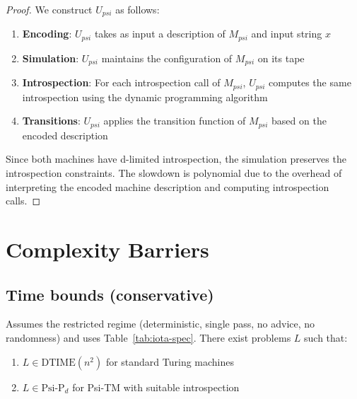 \begin{proof}
We construct $U_{psi}$ as follows:

\begin{enumerate}
\item \textbf{Encoding}: $U_{psi}$ takes as input a description of $M_{psi}$ and input string $x$
\item \textbf{Simulation}: $U_{psi}$ maintains the configuration of $M_{psi}$ on its tape
\item \textbf{Introspection}: For each introspection call of $M_{psi}$, $U_{psi}$ computes the same introspection using the dynamic programming algorithm
\item \textbf{Transitions}: $U_{psi}$ applies the transition function of $M_{psi}$ based on the encoded description
\end{enumerate}

Since both machines have d-limited introspection, the simulation preserves the introspection constraints. The slowdown is polynomial due to the overhead of interpreting the encoded machine description and computing introspection calls.
\end{proof}

\section{Complexity Barriers}

\subsection{Time bounds (conservative)}

\begin{theorem}
Assumes the restricted regime (deterministic, single pass, no advice, no randomness) and uses Table~\ref{tab:iota-spec}.
There exist problems $L$ such that:
\begin{enumerate}
\item $L \in \text{DTIME}(n^2)$ for standard Turing machines
\item $L \in \text{Psi-P}_d$ for Psi-TM with suitable introspection
\end{enumerate}
\end{theorem}

